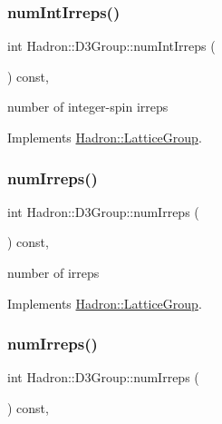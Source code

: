 \subsubsection{\texorpdfstring{numIntIrreps()}{numIntIrreps()}\hspace{0.1cm}{\footnotesize\ttfamily [2/2]}}
{\footnotesize\ttfamily int Hadron\+::\+D3\+Group\+::num\+Int\+Irreps (\begin{DoxyParamCaption}{ }\end{DoxyParamCaption}) const\hspace{0.3cm}{\ttfamily [inline]}, {\ttfamily [virtual]}}

number of integer-\/spin irreps 

Implements \mbox{\hyperlink{structHadron_1_1LatticeGroup_af2aa7b39222bf188389356eefcef7547}{Hadron\+::\+Lattice\+Group}}.

\mbox{\label{structHadron_1_1D3Group_a33e3822d1ec56e4928e5bc47b655f69f}} 
\subsubsection{\texorpdfstring{numIrreps()}{numIrreps()}\hspace{0.1cm}{\footnotesize\ttfamily [1/2]}}
{\footnotesize\ttfamily int Hadron\+::\+D3\+Group\+::num\+Irreps (\begin{DoxyParamCaption}{ }\end{DoxyParamCaption}) const\hspace{0.3cm}{\ttfamily [inline]}, {\ttfamily [virtual]}}

number of irreps 

Implements \mbox{\hyperlink{structHadron_1_1LatticeGroup_a3edaca488144b5d2a9cf73fe653add34}{Hadron\+::\+Lattice\+Group}}.

\mbox{\label{structHadron_1_1D3Group_a33e3822d1ec56e4928e5bc47b655f69f}} 
\subsubsection{\texorpdfstring{numIrreps()}{numIrreps()}\hspace{0.1cm}{\footnotesize\ttfamily [2/2]}}
{\footnotesize\ttfamily int Hadron\+::\+D3\+Group\+::num\+Irreps (\begin{DoxyParamCaption}{ }\end{DoxyParamCaption}) const\hspace{0.3cm}{\ttfamily [inline]}, {\ttfamily [virtual]}}

